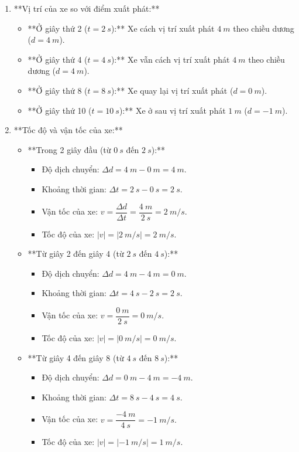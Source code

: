 \begin{vd}
{\begin{enumerate}[label=\alph*)]
			\item **Vị trí của xe so với điểm xuất phát:**
			\begin{itemize}
				\item **Ở giây thứ 2 ($t=\SI{2}{s}$):** Xe cách vị trí xuất phát $\SI{4}{m}$ theo chiều dương ($d=\SI{4}{m}$).
				\item **Ở giây thứ 4 ($t=\SI{4}{s}$):** Xe vẫn cách vị trí xuất phát $\SI{4}{m}$ theo chiều dương ($d=\SI{4}{m}$).
				\item **Ở giây thứ 8 ($t=\SI{8}{s}$):** Xe quay lại vị trí xuất phát ($d=\SI{0}{m}$).
				\item **Ở giây thứ 10 ($t=\SI{10}{s}$):** Xe ở sau vị trí xuất phát $\SI{1}{m}$ ($d=\SI{-1}{m}$).
			\end{itemize}
			
			\item **Tốc độ và vận tốc của xe:**
			\begin{itemize}
				\item **Trong 2 giây đầu (từ $\SI{0}{s}$ đến $\SI{2}{s}$):**
				\begin{itemize}
					\item Độ dịch chuyển: $\Delta d = \SI{4}{m} - \SI{0}{m} = \SI{4}{m}.$
					\item Khoảng thời gian: $\Delta t = \SI{2}{s} - \SI{0}{s} = \SI{2}{s}.$
					\item Vận tốc của xe: $v = \dfrac{\Delta d}{\Delta t} = \dfrac{\SI{4}{m}}{\SI{2}{s}} = \SI{2}{m/s}.$
					\item Tốc độ của xe: $|v| = |\SI{2}{m/s}| = \SI{2}{m/s}.$
				\end{itemize}
				\item **Từ giây 2 đến giây 4 (từ $\SI{2}{s}$ đến $\SI{4}{s}$):**
				\begin{itemize}
					\item Độ dịch chuyển: $\Delta d = \SI{4}{m} - \SI{4}{m} = \SI{0}{m}.$
					\item Khoảng thời gian: $\Delta t = \SI{4}{s} - \SI{2}{s} = \SI{2}{s}.$
					\item Vận tốc của xe: $v = \dfrac{\SI{0}{m}}{\SI{2}{s}} = \SI{0}{m/s}.$
					\item Tốc độ của xe: $|v| = |\SI{0}{m/s}| = \SI{0}{m/s}.$
				\end{itemize}
				\item **Từ giây 4 đến giây 8 (từ $\SI{4}{s}$ đến $\SI{8}{s}$):**
				\begin{itemize}
					\item Độ dịch chuyển: $\Delta d = \SI{0}{m} - \SI{4}{m} = \SI{-4}{m}.$
					\item Khoảng thời gian: $\Delta t = \SI{8}{s} - \SI{4}{s} = \SI{4}{s}.$
					\item Vận tốc của xe: $v = \dfrac{\SI{-4}{m}}{\SI{4}{s}} = \SI{-1}{m/s}.$
					\item Tốc độ của xe: $|v| = |\SI{-1}{m/s}| = \SI{1}{m/s}.$
				\end{itemize}
			\end{itemize}
			

\end{enumerate}}
\end{vd}
